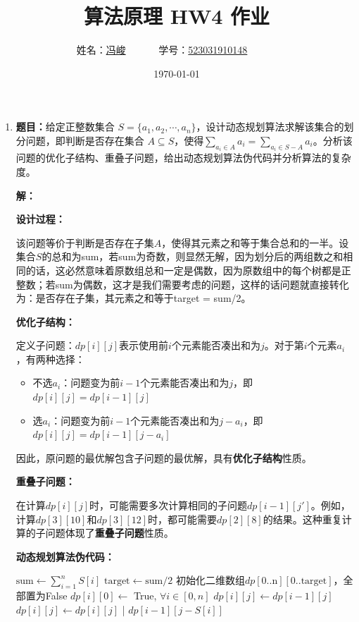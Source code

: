 \documentclass[UTF8,12pt,a4paper]{ctexart}
\title{算法原理 HW4 作业}
\author{
	姓名：\underline{冯峻}~~~~~~
	学号：\underline{523031910148}~~~~~~}
\date{\today}
\begin{document}
\fancyfoot[C]{\thepage}

\maketitle
\tableofcontents

\begin{enumerate}[1.]
	\item \textbf{题目：}给定正整数集合 $S=\{a_1, a_2,\cdots, a_n\}$，设计动态规划算法求解该集合的划分问题，即判断是否存在集合 $A\subseteq S$，使得$\sum_{a_i\in A}a_i=\sum_{a_i\in S-A}a_i$。分析该问题的优化子结构、重叠子问题，给出动态规划算法伪代码并分析算法的复杂度。

	\textbf{解：}

	\textbf{设计过程：}

	该问题等价于判断是否存在子集$A$，使得其元素之和等于集合总和的一半。设集合$S$的总和为sum，若sum为奇数，则显然无解，因为划分后的两组数之和相同的话，这必然意味着原数组总和一定是偶数，因为原数组中的每个树都是正整数；若sum为偶数，这才是我们需要考虑的问题，这样的话问题就直接转化为：是否存在子集，其元素之和等于target = sum/2。

	\textbf{优化子结构：}

	定义子问题：$dp[i][j]$表示使用前$i$个元素能否凑出和为$j$。对于第$i$个元素$a_i$，有两种选择：
	\begin{itemize}
		\item 不选$a_i$：问题变为前$i-1$个元素能否凑出和为$j$，即$dp[i][j] = dp[i-1][j]$
		\item 选$a_i$：问题变为前$i-1$个元素能否凑出和为$j-a_i$，即$dp[i][j] = dp[i-1][j-a_i]$
	\end{itemize}
	
	因此，原问题的最优解包含子问题的最优解，具有\textbf{优化子结构}性质。

	\textbf{重叠子问题：}

	在计算$dp[i][j]$时，可能需要多次计算相同的子问题$dp[i-1][j']$。例如，计算$dp[3][10]$和$dp[3][12]$时，都可能需要$dp[2][8]$的结果。这种重复计算的子问题体现了\textbf{重叠子问题}性质。

	\textbf{动态规划算法伪代码：}
	\begin{algorithm}[H]%
		\caption{SUBSET-PARTITION($S$)}
		\begin{algorithmic}[1]
			\State $\text{sum} \gets \sum_{i=1}^{n} S[i]$
				\State {}
			\EndIf
			\State $\text{target} \gets \text{sum} / 2$
			\State 初始化二维数组$dp[0..\text{n}][0..\text{target}]$，全部置为False
			\State $dp[i][0] \gets$ True, $\forall i \in [0, n]$ 
					\State $dp[i][j] \gets dp[i-1][j]$ 
						\State $dp[i][j] \gets dp[i][j]$ | $dp[i-1][j-S[i]]$ 
					\EndIf
				\EndFor
			\EndFor
			\State {}
		\end{algorithmic}
	\end{algorithm}


\end{enumerate}
\end{document}

